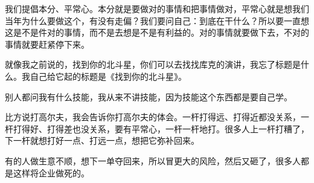 我们提倡本分、平常心。本分就是要做对的事情和把事情做对，平常心就是想我们当年为什么要做这个，有没有走偏？我们要问自己：到底在干什么？所以要一直想这是不是件对的事情，而不是去想是不是有利益的。对的事情就要做下去，不对的事情就要赶紧停下来。


就像我之前说的，找到你的北斗星，你们可以去找找库克的演讲，我忘了标题是什么。我自己给它起的标题是《找到你的北斗星》。

别人都问我有什么技能，我从来不讲技能，因为技能这个东西都是要自己学。

比方说打高尔夫，我会告诉你打高尔夫的体会。一杆打得远、打得近都没关系，一杆打得好、打得差也没关系，要有平常心，一杆一杆地打。很多人上一杆打糟了，下一杆就想打好一点、打远一点，想把它弥补回来。

有的人做生意不顺，想下一单夺回来，所以冒更大的风险，然后又砸了，很多人都是这样将企业做死的。
